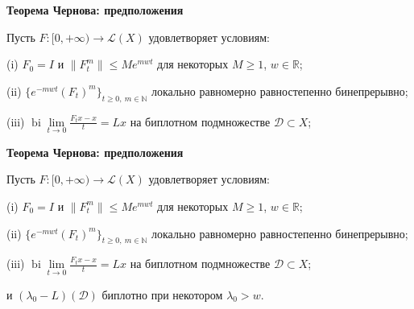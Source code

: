 \documentclass[11pt]{article}
\newcommand{\R}{\mathbb{R}}
\newcommand{\N}{\mathbb{N}}
\begin{document}
\begin{center}
{\color{notaeYELLOW}\bfseries\fontsize{44}{52}\selectfont Теорема Чернова: предположения}
\end{center}
\vspace*{\fill}
\begin{center}
\fontsize{36}{43}\selectfont
\parbox{\linewidth}{\centering\noindent Пусть $F:[0,+\infty)\to\mathcal{L}(X)$ удовлетворяет условиям:
\par}\vspace{0.4in}
\parbox{\linewidth}{\centering\noindent (i) $F_0=I$ и $\|F_t^m\|\le Me^{mwt}$ для некоторых $M\ge1$, $w\in\R$;
\par}\vspace{0.4in}
\parbox{\linewidth}{\centering\noindent (ii) $\{e^{-mwt}(F_t)^m\}_{t\ge0,\ m\in\N}$ локально равномерно равностепенно бинепрерывно;
\par}\vspace{0.4in}
\parbox{\linewidth}{\centering\noindent (iii) $\operatorname{bi}\lim\limits_{t\to0}\frac{F_t x-x}{t}=Lx$ на биплотном подмножестве $\mathcal{D}\subset X$;
\par}\vspace{0.4in}
\end{center}
\vspace*{\fill}

\newpage

\begin{center}
{\color{notaeYELLOW}\bfseries\fontsize{44}{52}\selectfont Теорема Чернова: предположения}
\end{center}
\vspace*{\fill}
\begin{center}
\fontsize{36}{43}\selectfont
\parbox{\linewidth}{\centering\noindent Пусть $F:[0,+\infty)\to\mathcal{L}(X)$ удовлетворяет условиям:
\par}\vspace{0.4in}
\parbox{\linewidth}{\centering\noindent (i) $F_0=I$ и $\|F_t^m\|\le Me^{mwt}$ для некоторых $M\ge1$, $w\in\R$;
\par}\vspace{0.4in}
\parbox{\linewidth}{\centering\noindent (ii) $\{e^{-mwt}(F_t)^m\}_{t\ge0,\ m\in\N}$ локально равномерно равностепенно бинепрерывно;
\par}\vspace{0.4in}
\parbox{\linewidth}{\centering\noindent (iii) $\operatorname{bi}\lim\limits_{t\to0}\frac{F_t x-x}{t}=Lx$ на биплотном подмножестве $\mathcal{D}\subset X$;
\par}\vspace{0.4in}
\parbox{\linewidth}{\centering\noindent и $(\lambda_0-L)(\mathcal{D})$ биплотно при некотором $\lambda_0>w$.
\par}\vspace{0.4in}
\end{center}
\vspace*{\fill}
\end{document}

